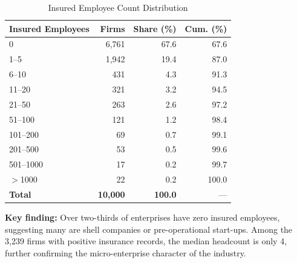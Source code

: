 \documentclass[12pt,a4paper]{article}
\newcommand{\tableHeaderRow}{\rowcolor{tealPrimary}\color{white}}
\newcommand{\tableOddRow}{\rowcolor{mintBG}}
\newcommand{\tableEvenRow}{\rowcolor{white}}
\begin{document}
\begin{table}[H]
\centering
\caption{Insured Employee Count Distribution}
\label{tab:insurance}
\begin{tabular}{lrrr}
\toprule
\tableHeaderRow
\textbf{Insured Employees} & \textbf{Firms} & \textbf{Share (\%)} & \textbf{Cum. (\%)} \\
\midrule
\tableOddRow  0           & 6,761 & 67.6 & 67.6  \\
\tableEvenRow 1--5        & 1,942 & 19.4 & 87.0  \\
\tableOddRow  6--10       & 431   & 4.3  & 91.3  \\
\tableEvenRow 11--20      & 321   & 3.2  & 94.5  \\
\tableOddRow  21--50      & 263   & 2.6  & 97.2  \\
\tableEvenRow 51--100     & 121   & 1.2  & 98.4  \\
\tableOddRow  101--200    & 69    & 0.7  & 99.1  \\
\tableEvenRow 201--500    & 53    & 0.5  & 99.6  \\
\tableOddRow  501--1000   & 17    & 0.2  & 99.7  \\
\tableEvenRow $>$1000     & 22    & 0.2  & 100.0 \\
\midrule
\tableOddRow  \textbf{Total} & \textbf{10,000} & \textbf{100.0} & --- \\
\bottomrule
\end{tabular}
\end{table}

\textbf{Key finding:} Over two-thirds of enterprises have zero insured employees,
suggesting many are shell companies or pre-operational start-ups. Among the 3,239 firms
with positive insurance records, the median headcount is only 4, further confirming
the micro-enterprise character of the industry.
\end{document}
